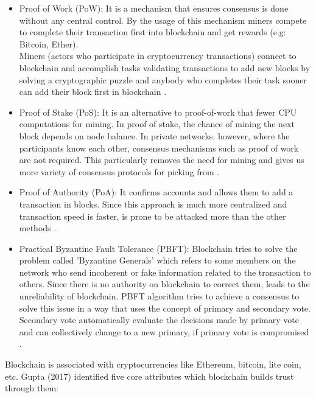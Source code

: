 \begin{itemize}
    \item Proof of Work (PoW): 
    It is a mechanism that ensures consensus is done without any central control. By the usage of this mechanism miners compete to complete their transaction first into blockchain and get rewards (e.g: Bitcoin, Ether).\\
    Miners (actors who participate in cryptocurrency transactions) connect to blockchain and accomplish tasks validating transactions to add new blocks by solving a cryptographic puzzle and anybody who completes their task sooner can add their block first in blockchain \cite{Pablo}.
    \item Proof of Stake (PoS): 
    It is an alternative to proof-of-work that fewer CPU computations for mining. In proof of stake, the chance of mining the next block depends on node balance. 
    In private networks, however, where the participants know each other, consensus mechanisms such as proof of work are not required. This particularly removes the need for mining and gives us more variety of consensus protocols for picking from \cite{Christidis}.
    \item Proof of Authority (PoA): It confirms accounts and allows them to add a transaction in blocks. Since this approach is much more centralized and transaction speed is faster, is prone to be attacked more than the other methods \cite{Luke}.
    \item Practical Byzantine Fault Tolerance (PBFT): Blockchain tries to solve the problem called 'Byzantine Generals' which refers to some members on the network who send incoherent or fake information related to the transaction to others. Since there is no authority on blockchain to correct them, leads to the unreliability of blockchain. PBFT algorithm tries to achieve a consensus to solve this issue in a way that uses the concept of primary and secondary vote. Secondary vote automatically evaluate the decisions made by primary vote and can collectively change to a new primary, if primary vote is compromised \cite{Luke}.
\end{itemize}
Blockchain is associated with cryptocurrencies like Ethereum, bitcoin, lite coin, etc. Gupta (2017) \cite{Gupta} identified five core attributes which blockchain builds trust through them:

